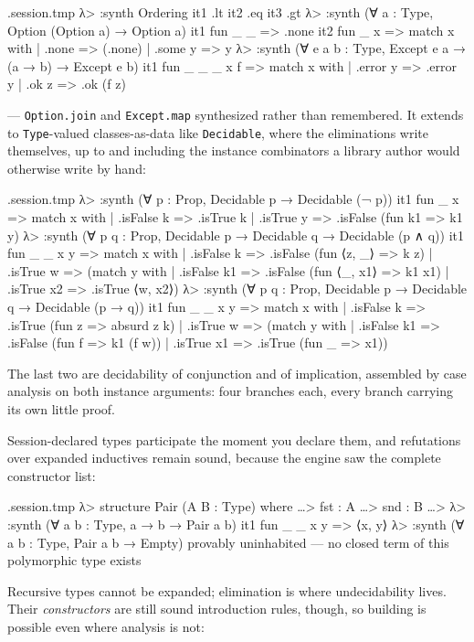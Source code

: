 \documentclass[11pt,oneside]{article}
\newcommand{\code}[1]{\texttt{#1}}
\newenvironment{session}
 {\VerbatimEnvironment\begin{VerbatimOut}{\jobname.session.tmp}}
 {\end{VerbatimOut}%
  \begin{sessionouter}%
  \VerbatimInput[fontsize=\footnotesize, breaklines=true,
    breaksymbolleft={\textcolor{stone}{\footnotesize$\hookrightarrow$}},
    formatcom=\color{ink}, tabsize=4]{\jobname.session.tmp}%
  \end{sessionouter}}
\begin{document}
\begin{session}
λ> :synth Ordering
  it1  .lt
  it2  .eq
  it3  .gt
λ> :synth (∀ a : Type, Option (Option a) → Option a)
  it1  fun _ _ => .none
  it2  fun _ x => match x with | .none => (.none) | .some y => y
λ> :synth (∀ e a b : Type, Except e a → (a → b) → Except e b)
  it1  fun _ _ _ x f => match x with | .error y => .error y | .ok z => .ok (f z)
\end{session}

--- \code{Option.join} and \code{Except.map} synthesized rather than
remembered. It extends to \code{Type}-valued classes-as-data like
\code{Decidable}, where the eliminations write themselves, up to and
including the instance combinators a library author would otherwise
write by hand:

\begin{session}
λ> :synth (∀ p : Prop, Decidable p → Decidable (¬ p))
  it1  fun _ x => match x with | .isFalse k => .isTrue k | .isTrue y => .isFalse (fun k1 => k1 y)
λ> :synth (∀ p q : Prop, Decidable p → Decidable q → Decidable (p ∧ q))
  it1  fun _ _ x y => match x with | .isFalse k => .isFalse (fun ⟨z, _⟩ => k z) | .isTrue w => (match y with | .isFalse k1 => .isFalse (fun ⟨_, x1⟩ => k1 x1) | .isTrue x2 => .isTrue ⟨w, x2⟩)
λ> :synth (∀ p q : Prop, Decidable p → Decidable q → Decidable (p → q))
  it1  fun _ _ x y => match x with | .isFalse k => .isTrue (fun z => absurd z k) | .isTrue w => (match y with | .isFalse k1 => .isFalse (fun f => k1 (f w)) | .isTrue x1 => .isTrue (fun _ => x1))
\end{session}

The last two are decidability of conjunction and of implication,
assembled by case analysis on both instance arguments: four
branches each, every branch carrying its own little proof.

Session-declared types participate the moment you declare them, and
refutations over expanded inductives remain sound, because the engine
saw the complete constructor list:

\begin{session}
λ> structure Pair (A B : Type) where
…>   fst : A
…>   snd : B
…>
λ> :synth (∀ a b : Type, a → b → Pair a b)
  it1  fun _ _ x y => ⟨x, y⟩
λ> :synth (∀ a b : Type, Pair a b → Empty)
provably uninhabited — no closed term of this polymorphic type exists
\end{session}

Recursive types cannot be expanded; elimination is where
undecidability lives. Their \emph{constructors} are still sound
introduction rules, though, so building is possible even where
analysis is not:
\end{document}

